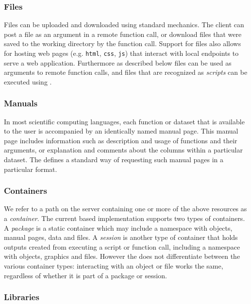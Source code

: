 \subsubsection{Files}

Files can be uploaded and downloaded using standard \HTTP mechanics. The client can post a file as an argument in a remote function call, or download files that were saved to the working directory by the function call. Support for files also allows for hosting web pages (e.g. \texttt{html}, \texttt{css}, \texttt{js}) that interact with local \API endpoints to serve a web application. Furthermore as described below files can be used as arguments to remote function calls, and files that are recognized as \emph{scripts} can be executed using \RPC.

\subsubsection{Manuals}

In most scientific computing languages, each function or dataset that is available to the user is accompanied by an identically named manual page. This manual page includes information such as description and usage of functions and their arguments, or explanation and comments about the columns within a particular dataset. The \API defines a standard way of requesting such manual pages in a particular format.

\subsubsection{Containers}
 
We refer to a path on the server containing one or more of the above resources as a \emph{container}. The current \R based \OpenCPU implementation supports two types of containers. A \emph{package} is a static container which may include a namespace with objects, manual pages, data and files. A \emph{session} is another type of container that holds outputs created from executing a script or function call, including a namespace with objects, graphics and files. However the \API does not differentiate between the various container types: interacting with an object or file works the same, regardless of whether it is part of a package or session.

\subsubsection{Libraries}

